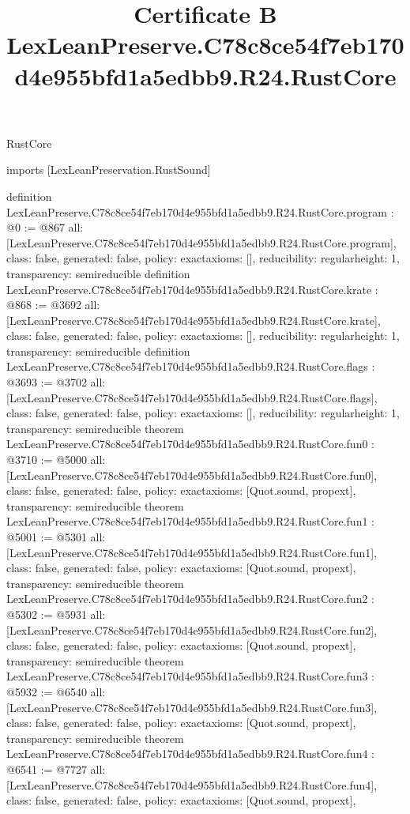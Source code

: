 \begin{lexlean}{RustCore}
\title{Certificate B LexLeanPreserve.C78c8ce54f7eb170d4e955bfd1a5edbb9.R24.RustCore}
\begin{coremodule}
imports [LexLeanPreservation.RustSound]

definition LexLeanPreserve.C78c8ce54f7eb170d4e955bfd1a5edbb9.R24.RustCore.program : @0 := @867 {
  all: [LexLeanPreserve.C78c8ce54f7eb170d4e955bfd1a5edbb9.R24.RustCore.program],
  class: false,
  generated: false,
  policy: exact{axioms: []},
  reducibility: regular{height: 1},
  transparency: semireducible
}
definition LexLeanPreserve.C78c8ce54f7eb170d4e955bfd1a5edbb9.R24.RustCore.krate : @868 := @3692 {
  all: [LexLeanPreserve.C78c8ce54f7eb170d4e955bfd1a5edbb9.R24.RustCore.krate],
  class: false,
  generated: false,
  policy: exact{axioms: []},
  reducibility: regular{height: 1},
  transparency: semireducible
}
definition LexLeanPreserve.C78c8ce54f7eb170d4e955bfd1a5edbb9.R24.RustCore.flags : @3693 := @3702 {
  all: [LexLeanPreserve.C78c8ce54f7eb170d4e955bfd1a5edbb9.R24.RustCore.flags],
  class: false,
  generated: false,
  policy: exact{axioms: []},
  reducibility: regular{height: 1},
  transparency: semireducible
}
theorem LexLeanPreserve.C78c8ce54f7eb170d4e955bfd1a5edbb9.R24.RustCore.fun0 : @3710 := @5000 {
  all: [LexLeanPreserve.C78c8ce54f7eb170d4e955bfd1a5edbb9.R24.RustCore.fun0],
  class: false,
  generated: false,
  policy: exact{axioms: [Quot.sound, propext]},
  transparency: semireducible
}
theorem LexLeanPreserve.C78c8ce54f7eb170d4e955bfd1a5edbb9.R24.RustCore.fun1 : @5001 := @5301 {
  all: [LexLeanPreserve.C78c8ce54f7eb170d4e955bfd1a5edbb9.R24.RustCore.fun1],
  class: false,
  generated: false,
  policy: exact{axioms: [Quot.sound, propext]},
  transparency: semireducible
}
theorem LexLeanPreserve.C78c8ce54f7eb170d4e955bfd1a5edbb9.R24.RustCore.fun2 : @5302 := @5931 {
  all: [LexLeanPreserve.C78c8ce54f7eb170d4e955bfd1a5edbb9.R24.RustCore.fun2],
  class: false,
  generated: false,
  policy: exact{axioms: [Quot.sound, propext]},
  transparency: semireducible
}
theorem LexLeanPreserve.C78c8ce54f7eb170d4e955bfd1a5edbb9.R24.RustCore.fun3 : @5932 := @6540 {
  all: [LexLeanPreserve.C78c8ce54f7eb170d4e955bfd1a5edbb9.R24.RustCore.fun3],
  class: false,
  generated: false,
  policy: exact{axioms: [Quot.sound, propext]},
  transparency: semireducible
}
theorem LexLeanPreserve.C78c8ce54f7eb170d4e955bfd1a5edbb9.R24.RustCore.fun4 : @6541 := @7727 {
  all: [LexLeanPreserve.C78c8ce54f7eb170d4e955bfd1a5edbb9.R24.RustCore.fun4],
  class: false,
  generated: false,
  policy: exact{axioms: [Quot.sound, propext]},
}
\end{coremodule}
\end{lexlean}
